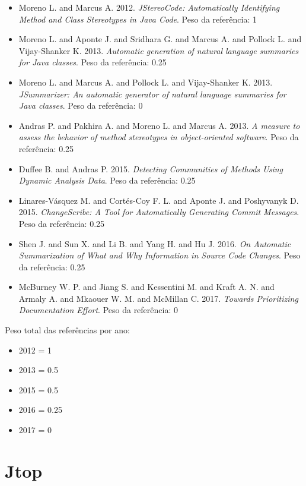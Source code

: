 \begin{itemize}
\item Moreno L. and Marcus A.
      2012.
      {\it JStereoCode: Automatically Identifying Method and Class Stereotypes in Java Code}.
      Peso da referência: 1
\item Moreno L. and Aponte J. and Sridhara G. and Marcus A. and Pollock L. and Vijay-Shanker K.
      2013.
      {\it Automatic generation of natural language summaries for Java classes}.
      Peso da referência: 0.25
\item Moreno L. and Marcus A. and Pollock L. and Vijay-Shanker K.
      2013.
      {\it JSummarizer: An automatic generator of natural language summaries for Java classes}.
      Peso da referência: 0
\item Andras P. and Pakhira A. and Moreno L. and Marcus A.
      2013.
      {\it A measure to assess the behavior of method stereotypes in object-oriented software}.
      Peso da referência: 0.25
\item Duffee B. and Andras P.
      2015.
      {\it Detecting Communities of Methods Using Dynamic Analysis Data}.
      Peso da referência: 0.25
\item Linares-V\'{a}squez M. and Cort{\'e}s-Coy F. L. and Aponte J. and Poshyvanyk D.
      2015.
      {\it ChangeScribe: A Tool for Automatically Generating Commit Messages}.
      Peso da referência: 0.25
\item Shen J. and Sun X. and Li B. and Yang H. and Hu J.
      2016.
      {\it On Automatic Summarization of What and Why Information in Source Code Changes}.
      Peso da referência: 0.25
\item McBurney W. P. and Jiang S. and Kessentini M. and Kraft A. N. and Armaly A. and Mkaouer W. M. and McMillan C.
      2017.
      {\it Towards Prioritizing Documentation Effort}.
      Peso da referência: 0
\end{itemize}

Peso total das referências por ano:

\begin{itemize}
\item 2012 = 1
\item 2013 = 0.5
\item 2015 = 0.5
\item 2016 = 0.25
\item 2017 = 0
\end{itemize}


\section{Jtop}

